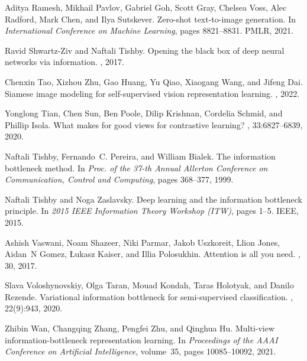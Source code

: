 \documentclass[10pt,twocolumn,letterpaper]{article}
\begin{document}
\begin{thebibliography}{10}
	Aditya Ramesh, Mikhail Pavlov, Gabriel Goh, Scott Gray, Chelsea Voss, Alec
	Radford, Mark Chen, and Ilya Sutskever.
	\newblock Zero-shot text-to-image generation.
	\newblock In {\em International Conference on Machine Learning}, pages
	8821--8831. PMLR, 2021.
	
	Ravid Shwartz-Ziv and Naftali Tishby.
	\newblock Opening the black box of deep neural networks via information.
	, 2017.
	
	Chenxin Tao, Xizhou Zhu, Gao Huang, Yu Qiao, Xiaogang Wang, and Jifeng Dai.
	\newblock Siamese image modeling for self-supervised vision representation
	learning.
	, 2022.
	
	Yonglong Tian, Chen Sun, Ben Poole, Dilip Krishnan, Cordelia Schmid, and
	Phillip Isola.
	\newblock What makes for good views for contrastive learning?
	,
	33:6827--6839, 2020.
	
	Naftali Tishby, Fernando~C. Pereira, and William Bialek.
	\newblock The information bottleneck method.
	\newblock In {\em Proc. of the 37-th Annual Allerton Conference on
		Communication, Control and Computing}, pages 368--377, 1999.
	
	Naftali Tishby and Noga Zaslavsky.
	\newblock Deep learning and the information bottleneck principle.
	\newblock In {\em 2015 IEEE Information Theory Workshop (ITW)}, pages 1--5.
	IEEE, 2015.
	
	Ashish Vaswani, Noam Shazeer, Niki Parmar, Jakob Uszkoreit, Llion Jones,
	Aidan~N Gomez, {\L}ukasz Kaiser, and Illia Polosukhin.
	\newblock Attention is all you need.
	, 30, 2017.
	
	Slava Voloshynovskiy, Olga Taran, Mouad Kondah, Taras Holotyak, and Danilo
	Rezende.
	\newblock Variational information bottleneck for semi-supervised
	classification.
	, 22(9):943, 2020.
	
	Zhibin Wan, Changqing Zhang, Pengfei Zhu, and Qinghua Hu.
	\newblock Multi-view information-bottleneck representation learning.
	\newblock In {\em Proceedings of the AAAI Conference on Artificial
		Intelligence}, volume~35, pages 10085--10092, 2021.
	

\end{thebibliography}
\end{document}
